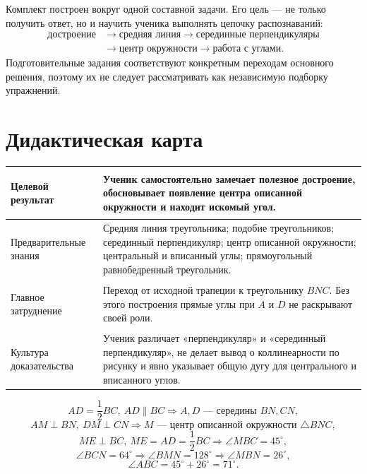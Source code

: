 

\begin{teacherbox}
Комплект построен вокруг одной составной задачи. Его цель — не только получить
ответ, но и научить ученика выполнять цепочку распознаваний:
\[
\begin{aligned}
\text{достроение}
&\longrightarrow
\text{средняя линия}
\longrightarrow
\text{серединные перпендикуляры}\\
&\longrightarrow
\text{центр окружности}
\longrightarrow
\text{работа с углами}.
\end{aligned}
\]
Подготовительные задания соответствуют конкретным переходам основного решения,
поэтому их не следует рассматривать как независимую подборку упражнений.
\end{teacherbox}

\section{Дидактическая карта}

\begin{tabularx}{\linewidth}{@{}>{\bfseries\sffamily\raggedright\arraybackslash}p{42mm}>{\raggedright\arraybackslash}X@{}}
\toprule
Целевой результат & Ученик самостоятельно замечает полезное достроение,
обосновывает появление центра описанной окружности и находит искомый угол.\\
\midrule
Предварительные знания & Средняя линия треугольника; подобие треугольников;
серединный перпендикуляр; центр описанной окружности; центральный и вписанный
углы; прямоугольный равнобедренный треугольник.\\
\midrule
Главное затруднение & Переход от исходной трапеции к треугольнику \(BNC\).
Без этого построения прямые углы при \(A\) и \(D\) не раскрывают своей роли.\\
\midrule
Культура доказательства & Ученик различает «перпендикуляр» и
«серединный перпендикуляр», не делает вывод о коллинеарности по рисунку и явно
указывает общую дугу для центрального и вписанного углов.\\
\bottomrule
\end{tabularx}

\begin{routebox}
\[
AD=\frac12BC,
\ AD\parallel BC
\Longrightarrow
A,D\text{ — середины }BN,CN,
\]
\[
AM\perp BN,
\ DM\perp CN
\Longrightarrow
M\text{ — центр описанной окружности }\triangle BNC,
\]
\[
ME\perp BC,
\ ME=AD=\frac12BC
\Longrightarrow
\angle MBC=45^\circ,
\]
\[
\angle BCN=64^\circ
\Longrightarrow
\angle BMN=128^\circ
\Longrightarrow
\angle MBN=26^\circ,
\]
\[
\angle ABC=45^\circ+26^\circ=71^\circ.
\]
\end{routebox}

